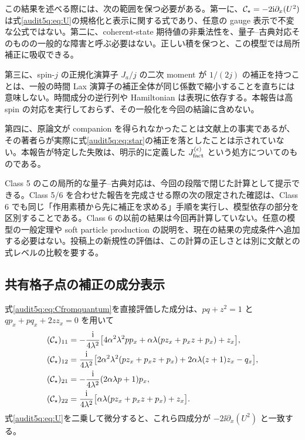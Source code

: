 この結果を述べる際には、次の範囲を保つ必要がある。第一に、$\mathcal C_{\star}=-2\mathrm i\partial_x(U^2)$ は式\eqref{audit5q:eq:U}の規格化と表示に関する式であり、任意の gauge 表示で不変な公式ではない。第二に、coherent-state 期待値の非乗法性を、量子--古典対応そのものの一般的な障害と呼ぶ必要はない。正しい積を保つと、この模型では局所補正に吸収できる。

第三に、spin-$j$ の正規化演算子 $J_a/j$ の二次 moment が $1/(2j)$ の補正を持つことは、一般の時間 Lax 演算子の補正全体が同じ係数で縮小することを直ちには意味しない。時間成分の逆行列や Hamiltonian は表現に依存する。本報告は高 spin の対応を実行しておらず、その一般化を今回の結論に含めない。

第四に、原論文が companion を得られなかったことは文献上の事実であるが\cite{DFN}、その著者らが実際に式\eqref{audit5q:eq:star}の補正を落としたことは示されていない。本報告が特定した失敗は、明示的に定義した $J_{\rm fact}^{(\epsilon)}$ という処方についてのものである。

Class 5 のこの局所的な量子--古典対応は、今回の段階で閉じた計算として提示できる。Class 5/6 を合わせた報告を完成させる際の次の限定された確認は、Class 6 でも同じ「作用素積から先に補正を求める」手順を実行し、模型依存の部分を区別することである。Class 6 の以前の結果は今回再計算していない。任意の模型の一般定理や soft particle production の説明を、現在の結果の完成条件へ追加する必要はない。投稿上の新規性の評価は、この計算の正しさとは別に文献との式レベルの比較を要する。

\subsection{共有格子点の補正の成分表示}
\label{audit5q:app:C}

式\eqref{audit5q:eq:Cfromquantum}を直接評価した成分は、$pq+z^2=1$ と $qp_x+pq_x+2zz_x=0$ を用いて
\begin{align}
(\mathcal C_{\star})_{11}&=-\frac{\mathrm i}{4\lambda^2}
\bigl[4\alpha^2\lambda^2pp_x+
\alpha\lambda(pz_x+p_xz+p_x)+z_x\bigr],\\
(\mathcal C_{\star})_{12}&=\frac{\mathrm i}{4\lambda^2}
\bigl[2\alpha^2\lambda^2(pz_x+p_xz+p_x)
+2\alpha\lambda(z+1)z_x-q_x\bigr],\\
(\mathcal C_{\star})_{21}&=-\frac{\mathrm i}{4\lambda^2}(2\alpha\lambda p+1)p_x,\\
(\mathcal C_{\star})_{22}&=\frac{\mathrm i}{4\lambda^2}
\bigl[\alpha\lambda(pz_x+p_xz+p_x)+z_x\bigr].
\end{align}
式\eqref{audit5q:eq:U}を二乗して微分すると、これら四成分が $-2\ii\partial_x(U^2)$ と一致する。

